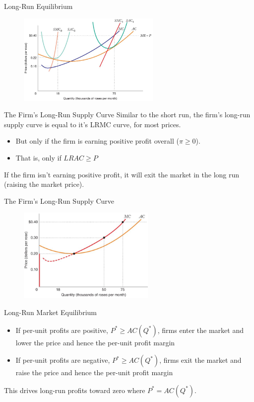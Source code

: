 \documentclass[11pt,t]{beamer}
\begin{document}
\begin{frame}{Long-Run Equilibrium}
  \begin{figure}
    \includegraphics[width=260px]{figures/fig9_12.jpg}
  \end{figure}
\end{frame}

\begin{frame}{The Firm's Long-Run Supply Curve}
  Similar to the short run, the firm's long-run supply curve is equal to it's LRMC curve, for most prices.

  \begin{itemize}
    \item But only if the firm is earning positive profit overall ($\pi \geq 0$).
    \item That is, only if $LRAC \geq P$
  \end{itemize}

  \bigskip
  If the firm isn't earning positive profit, it will exit the market in the long run (raising the market price).
\end{frame}

\begin{frame}{The Firm's Long-Run Supply Curve}
  \begin{figure}
    \includegraphics[width=250px]{figures/fig9_13.jpg}
  \end{figure}
\end{frame}

\begin{frame}{Long-Run Market Equilibrium}
  \begin{itemize}
    \item If per-unit profits are positive, $P^* \geq AC(Q^*)$, firms enter the market and lower the price and hence the per-unit profit margin
    \item If per-unit profits are negative, $P^* \geq AC(Q^*)$, firms exit the market and raise the price and hence the per-unit profit margin
  \end{itemize}
  
  \bigskip
  This drives long-run profits toward zero where $P^* = AC(Q^*)$.
\end{frame}
\end{document}
